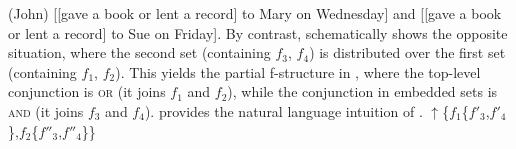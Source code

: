 \documentclass[output=paper]{../langscibook}
\begin{document}
\ea\label{ex:max:man:96:43:S2:para} (John) [[gave a book or lent a
    record] to Mary on Wednesday] and [[gave a book or lent a record] to Sue on Friday].
\z
By contrast,  schematically shows the opposite
situation, where the second set (containing $f_{3}$, $f_{4}$) is distributed
over the first set (containing $f_{1}$, $f_{2}$). This yields the partial
f-structure in , where the top-level
conjunction is \textsc{or} (it joins $f_{1}$ and $f_{2}$), while the conjunction
in embedded sets is \textsc{and} (it joins $f_{3}$ and
$f_{4}$).
  provides the natural language intuition
of .
\ea\label{ex:max:man:96:S1} $\uparrow$\{$f_{1}$\{$f'_{3}$,$f'_{4}$\},$f_{2}$\{$f''_{3}$,$f''_{4}$\}\}
\z
{}
\end{document}
